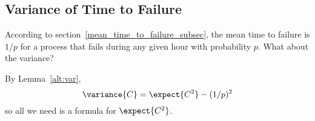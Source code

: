 \subsection{Variance of Time to Failure}
According to section~\ref{mean_time_to_failure_subsec}, the mean time
to failure is $1/p$ for a process that fails during any given hour
with probability $p$.  What about the variance?

By Lemma~\ref{alt:var},
\begin{equation}\label{varCEC2}
\variance{C} = \expect{C^2} - (1/p)^2
\end{equation}
so all we need is a formula for $\expect{C^2}$.

\iffalse

\begin{align}
\expect{C^2}
   & \eqdef \sum_{i\geq 1} i^2(1-p)^{i-1}p \notag\\ %
   & = p\sum_{i\geq 1} i^2x^{i-1} & \text{(where $x=1-p$)}\label{time_to_fail_gen_func}.
\end{align}
But~\eqref{squares_gen_func} gives the generating function
$x(1+x)/(1-x)^3$ for the nonnegative integer squares, and this implies that
the generating function for the sum in~\eqref{time_to_fail_gen_func} is
$(1+x)/(1-x)^3$.  So,
\begin{align}
\expect{C^2} & = p\, \frac{(1+x)}{(1-x)^3} & \text{(where $x=1-p$)}\notag\\
             & = p\, \frac{2+p}{p^3}\notag\\
             & = \frac{1-p}{p^2} + \frac{1}{p^2}\label{plus1p2},
\end{align}
Combining~\eqref{varCEC2} and~\eqref{plus1p2} gives a simple answer:
\begin{equation}\label{var_time_to_fail}
\variance{C} = \frac{1-p}{p^2} \,.
\end{equation}

It's great to be able apply generating function expertise to knock off
equation~\eqref{var_time_to_fail} mechanically just from the definition of
variance, but there's a more elementary, and memorable, alternative.\fi


